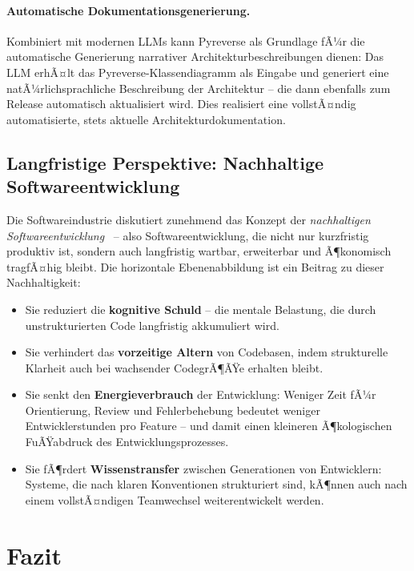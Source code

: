﻿\documentclass[a4paper,12pt]{article}
\begin{document}
\paragraph{Automatische Dokumentationsgenerierung.}
Kombiniert mit modernen LLMs kann Pyreverse als Grundlage fÃ¼r die automatische
Generierung narrativer Architekturbeschreibungen dienen: Das LLM erhÃ¤lt das
Pyreverse-Klassendiagramm als Eingabe und generiert eine natÃ¼rlichsprachliche
Beschreibung der Architektur -- die dann ebenfalls zum Release automatisch
aktualisiert wird. Dies realisiert eine vollstÃ¤ndig automatisierte,
stets aktuelle Architekturdokumentation.

\subsection{Langfristige Perspektive: Nachhaltige Softwareentwicklung}

Die Softwareindustrie diskutiert zunehmend das Konzept der \textit{nachhaltigen
	Softwareentwicklung}~\cite{naumann2011} -- also Softwareentwicklung, die nicht
nur kurzfristig produktiv ist, sondern auch langfristig wartbar, erweiterbar und
Ã¶konomisch tragfÃ¤hig bleibt. Die horizontale Ebenenabbildung ist ein Beitrag
zu dieser Nachhaltigkeit:

\begin{itemize}[leftmargin=*]
	\item Sie reduziert die \textbf{kognitive Schuld} -- die mentale Belastung,
	die durch unstrukturierten Code langfristig akkumuliert wird.
	\item Sie verhindert das \textbf{vorzeitige Altern} von Codebasen, indem
	strukturelle Klarheit auch bei wachsender CodegrÃ¶ÃŸe erhalten bleibt.
	\item Sie senkt den \textbf{Energieverbrauch} der Entwicklung: Weniger Zeit
	fÃ¼r Orientierung, Review und Fehlerbehebung bedeutet weniger
	Entwicklerstunden pro Feature -- und damit einen kleineren
	Ã¶kologischen FuÃŸabdruck des Entwicklungsprozesses.
	\item Sie fÃ¶rdert \textbf{Wissenstransfer} zwischen Generationen von
	Entwicklern: Systeme, die nach klaren Konventionen strukturiert sind,
	kÃ¶nnen auch nach einem vollstÃ¤ndigen Teamwechsel weiterentwickelt werden.
\end{itemize}

\section{Fazit}
\end{document}
